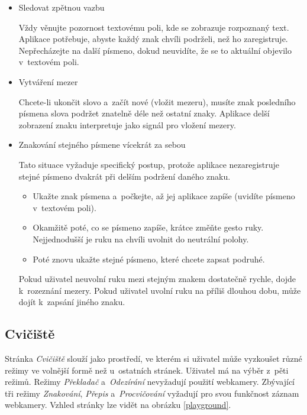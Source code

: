 \documentclass[
  master,
  program=ainfvs,
  biblatex,
  figures=true,
  tables=false,
  sourcecodes=true,
  glossaries,
  index
]{kidiplom}
\begin{document}
            \begin{itemize}
                \item Sledovat zpětnou vazbu \par
                    Vždy věnujte pozornost textovému poli, kde se zobrazuje rozpoznaný text. Aplikace potřebuje, abyste každý znak chvíli podrželi, než ho zaregistruje. Nepřecházejte na další písmeno, dokud neuvidíte, že se to aktuální objevilo v~textovém poli.
                
                \item Vytváření mezer \par
                Chcete-li ukončit slovo a~začít nové (vložit mezeru), musíte znak posledního písmena slova podržet znatelně déle než ostatní znaky. Aplikace delší zobrazení znaku interpretuje jako signál pro vložení mezery.
                
                \item Znakování stejného písmene vícekrát za sebou \par
                    Tato situace vyžaduje specifický postup, protože aplikace nezaregistruje stejné písmeno dvakrát při delším podržení daného znaku.
                    
                    \begin{itemize}
                        \item Ukažte znak písmena a~počkejte, až jej aplikace zapíše (uvidíte písmeno v~textovém poli).
                        \item Okamžitě poté, co se písmeno zapíše, krátce změňte gesto ruky. Nejjednodušší je ruku na chvíli uvolnit do neutrální polohy.
                        \item Poté znovu ukažte stejné písmeno, které chcete zapsat podruhé.
                    \end{itemize}

                    Pokud uživatel neuvolní ruku mezi stejným znakem dostatečně rychle, dojde k~rozeznání mezery. Pokud uživatel uvolní ruku na příliš dlouhou dobu, může dojít k~zapsání jiného znaku.
            \end{itemize}

    
    \subsection{Cvičiště}
        Stránka \emph{Cvičiště} slouží jako prostředí, ve kterém si uživatel může vyzkoušet různé režimy ve volnější formě než u~ostatních stránek. Uživatel má na výběr z~pěti režimů. Režimy \emph{Překladač} a~\emph{Odezírání} nevyžadují použití webkamery. Zbývající tři režimy \emph{Znakování}, \emph{Přepis} a~\emph{Procvičování} vyžadují pro svou funkčnost záznam webkamery. Vzhled stránky lze vidět na obrázku \ref{playground}.
\end{document}
